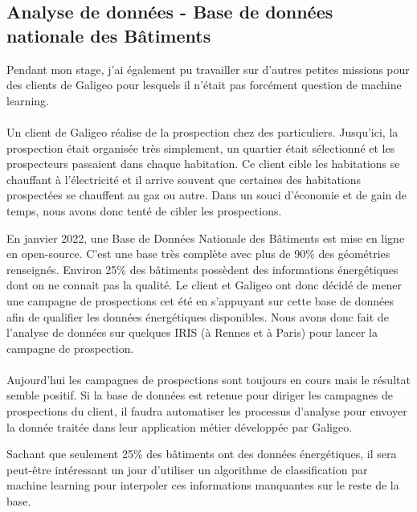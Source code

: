 \subsection{Analyse de données - Base de données nationale des Bâtiments}

Pendant mon stage, j’ai également pu travailler sur d’autres petites missions pour des clients de Galigeo pour lesquels il n’était pas forcément question de machine learning.

\paragraph{}

Un client de Galigeo réalise de la prospection chez des particuliers. Jusqu’ici, la prospection était organisée très simplement, un quartier était sélectionné et les prospecteurs passaient dans chaque habitation. Ce client cible les habitations se chauffant à l’électricité et il arrive souvent que certaines des habitations prospectées se chauffent au gaz ou autre. Dans un souci d’économie et de gain de temps, nous avons donc tenté de cibler les prospections.

En janvier 2022, une Base de Données Nationale des Bâtiments \cite{BDNB} est mise en ligne en open-source. C’est une base très complète avec plus de 90\% des géométries renseignés. Environ 25\% des bâtiments possèdent des informations énergétiques dont on ne connait pas la qualité. Le client et Galigeo ont donc décidé de mener une campagne de prospections cet été en s’appuyant sur cette base de données afin de qualifier les données énergétiques disponibles. Nous avons donc fait de l’analyse de données sur quelques IRIS (à Rennes et à Paris) pour lancer la campagne de prospection.

\paragraph{}

Aujourd’hui les campagnes de prospections sont toujours en cours mais le résultat semble positif. Si la base de données est retenue pour diriger les campagnes de prospections du client, il faudra automatiser les processus d’analyse pour envoyer la donnée traitée dans leur application métier développée par Galigeo.

Sachant que seulement 25\% des bâtiments ont des données énergétiques, il sera peut-être intéressant un jour d’utiliser un algorithme de classification par machine learning pour interpoler ces informations manquantes sur le reste de la base. 


